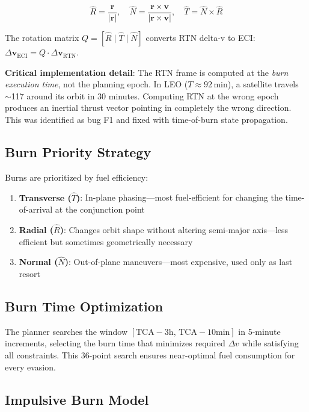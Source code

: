 \documentclass[11pt,a4paper]{article}
\begin{document}
\begin{equation}
\hat{R} = \frac{\mathbf{r}}{|\mathbf{r}|}, \quad
\hat{N} = \frac{\mathbf{r} \times \mathbf{v}}{|\mathbf{r} \times \mathbf{v}|}, \quad
\hat{T} = \hat{N} \times \hat{R}
\end{equation}

The rotation matrix $Q = [\hat{R} \mid \hat{T} \mid \hat{N}]$ converts
RTN delta-v to ECI:
$\Delta\mathbf{v}_\text{ECI} = Q \cdot \Delta\mathbf{v}_\text{RTN}$.

\textbf{Critical implementation detail}: The RTN frame is computed at the
\emph{burn execution time}, not the planning epoch. In LEO ($T \approx 92$\,min),
a satellite travels $\sim$117\textdegree{} around its orbit in 30 minutes.
Computing RTN at the wrong epoch produces an inertial thrust vector pointing
in completely the wrong direction. This was identified as bug F1 and fixed
with time-of-burn state propagation.

\subsection{Burn Priority Strategy}

Burns are prioritized by fuel efficiency:

\begin{enumerate}[nosep]
  \item \textbf{Transverse ($\hat{T}$)}: In-plane phasing---most fuel-efficient
        for changing the time-of-arrival at the conjunction point
  \item \textbf{Radial ($\hat{R}$)}: Changes orbit shape without altering
        semi-major axis---less efficient but sometimes geometrically necessary
  \item \textbf{Normal ($\hat{N}$)}: Out-of-plane maneuvers---most expensive,
        used only as last resort
\end{enumerate}

\subsection{Burn Time Optimization}

The planner searches the window $[\text{TCA} - 3\text{h},\, \text{TCA} - 10\text{min}]$
in 5-minute increments, selecting the burn time that minimizes required
$\Delta v$ while satisfying all constraints. This 36-point search ensures
near-optimal fuel consumption for every evasion.

\subsection{Impulsive Burn Model}
\end{document}
